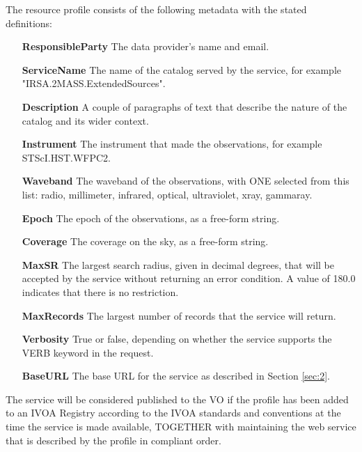 \documentclass[11pt,a4paper]{ivoa}
\begin{document}
The resource profile consists of the following metadata with the stated definitions:
\begin{itemize}
	\item[\textbf{ResponsibleParty}] The data provider's name and email.
	\item[\textbf{ServiceName}] The name of the catalog served by the service, for example "IRSA.2MASS.ExtendedSources".
	\item[\textbf{Description}] A couple of paragraphs of text that describe the nature of the catalog and its wider context.
	\item[\textbf{Instrument}] The instrument that made the observations, for example STScI.HST.WFPC2.
	\item[\textbf{Waveband}] The waveband of the observations, with ONE selected from this list: radio, millimeter, infrared, optical, ultraviolet, xray, gammaray.
	\item[\textbf{Epoch}] The epoch of the observations, as a free-form string.
	\item[\textbf{Coverage}] The coverage on the sky, as a free-form string.
	\item[\textbf{MaxSR}] The largest search radius, given in decimal degrees, that will be accepted by the service without returning an error condition. A value of 180.0 indicates that there is no restriction.
	\item[\textbf{MaxRecords}] The largest number of records that the service will return.
	\item[\textbf{Verbosity}] True or false, depending on whether the service supports the VERB keyword in the request.
	\item[\textbf{BaseURL}] The base URL for the service as described in Section \ref{sec:2}.
\end{itemize}
The service will be considered published to the VO if the profile has been added to an IVOA Registry according to the IVOA standards and conventions at the time the service is made available, TOGETHER with maintaining the web service that is described by the profile in compliant order.

\appendix
\end{document}
